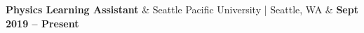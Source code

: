 \textbf{Physics Learning Assistant} & 
Seattle Pacific University | Seattle, WA & 
\textbf{Sept 2019 -- Present}